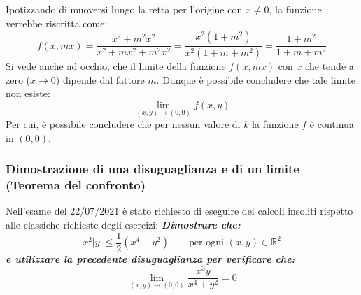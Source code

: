 \documentclass[a4paper]{article}
\begin{document}
	\noindent
	Ipotizzando di muoversi lungo la retta per l'origine con $x \ne 0$, la funzione verrebbe riscritta come:
	\begin{equation*}
		f\left(x,mx\right) = \dfrac{x^{2} + m^{2}x^{2}}{x^{2} + mx^{2} + m^{2}x^{2}} = \dfrac{x^{2}\left(1+m^{2}\right)}{x^{2}\left(1 + m + m^{2}\right)} = \dfrac{1 + m^{2}}{1 + m + m^{2}}
	\end{equation*}
	Si vede anche ad occhio, che il limite della funzione $f\left(x,mx\right)$ con $x$ che tende a zero ($x \rightarrow 0$) dipende dal fattore $m$. Dunque è possibile concludere che tale limite non esiste:
	\begin{equation*}
		\displaystyle\lim_{\left(x,y\right) \rightarrow \left(0,0\right)} f\left(x,y\right)
	\end{equation*}
	Per cui, è possibile concludere che per nessun valore di $k$ la funzione $f$ è continua in $\left(0,0\right)$.\newpage

	\subsubsection{Dimostrazione di una disuguaglianza e di un limite (Teorema del confronto)}

	Nell'esame del 22/07/2021 è stato richiesto di eseguire dei calcoli insoliti rispetto alle classiche richieste degli esercizi: \textcolor{Green4}{\textbf{\emph{Dimostrare che:}}
	\begin{equation*}
		x^{2} |y| \le \dfrac{1}{2}\left(x^{4} + y^{2}\right) \hspace{2em} \text{per ogni } \left(x,y\right) \in \mathbb{R}^{2}
	\end{equation*}
	\textbf{\emph{e utilizzare la precedente disuguaglianza per verificare che:}}
	\begin{equation*}
		\displaystyle\lim_{\left(x,y\right) \rightarrow \left(0,0\right)} \dfrac{x^{3} y}{x^{4} + y^{2}} = 0
	\end{equation*}}\:\newline
\end{document}
